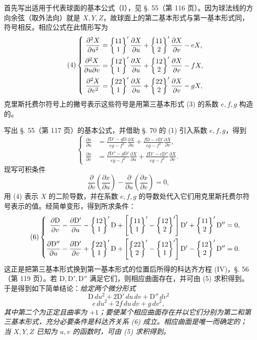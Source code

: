 首先写出适用于代表球面的基本公式（I），见 \S. 55（第 116 页）。因为球法线的方向余弦（取外法向）就是 \(X,Y,Z\)，故球面上的第二基本形式与第一基本形式同，符号相反。相应公式在此情形写为
\begin{equation}\tag{4}
\left\{
\begin{aligned}
\frac{\partial^2 X}{\partial u^2}&=\left\{\begin{matrix}11\\1\end{matrix}\right\}'\frac{\partial X}{\partial u}+\left\{\begin{matrix}11\\2\end{matrix}\right\}'\frac{\partial X}{\partial v}-eX,\\
\frac{\partial^2 X}{\partial u\partial v}&=\left\{\begin{matrix}12\\1\end{matrix}\right\}'\frac{\partial X}{\partial u}+\left\{\begin{matrix}12\\2\end{matrix}\right\}'\frac{\partial X}{\partial v}-fX,\\
\frac{\partial^2 X}{\partial v^2}&=\left\{\begin{matrix}22\\1\end{matrix}\right\}'\frac{\partial X}{\partial u}+\left\{\begin{matrix}22\\2\end{matrix}\right\}'\frac{\partial X}{\partial v}-gX,
\end{aligned}\right.
\end{equation}
克里斯托费尔符号上的撇号表示这些符号是用第三基本形式 (3) 的系数 \(e,f,g\) 构造的。

写出 \S. 55（第 117 页）的基本公式，并借助 \S. 70 的 (1) 引入系数 \(e,f,g\)，得到
\begin{equation}\tag{5}
\left\{
\begin{aligned}
\frac{\partial x}{\partial u}&=\frac{f\mathrm D'-g\mathrm D}{eg-f^2}\frac{\partial X}{\partial u}+\frac{f\mathrm D-e\mathrm D'}{eg-f^2}\frac{\partial X}{\partial v},\\
\frac{\partial x}{\partial v}&=\frac{f\mathrm D''-g\mathrm D'}{eg-f^2}\frac{\partial X}{\partial u}+\frac{f\mathrm D'-e\mathrm D''}{eg-f^2}\frac{\partial X}{\partial v}.
\end{aligned}\right.
\end{equation}
现写可积条件
\[
 \frac{\partial}{\partial v}\left(\frac{\partial x}{\partial u}\right)-\frac{\partial}{\partial u}\left(\frac{\partial x}{\partial v}\right)=0,
\]
用 (4) 表示 \(X\) 的二阶导数，并在系数 \(e,f,g\) 的导数处代入它们用克里斯托费尔符号表示的值。经简单变形，得到所求条件：
\begin{equation}\tag{6}
\left\{
\begin{aligned}
\frac{\partial\mathrm D}{\partial v}-\frac{\partial\mathrm D'}{\partial u}-\left\{\begin{matrix}12\\1\end{matrix}\right\}'\mathrm D+
\left[\left\{\begin{matrix}11\\1\end{matrix}\right\}'-\left\{\begin{matrix}12\\2\end{matrix}\right\}'\right]\mathrm D'+\left\{\begin{matrix}11\\2\end{matrix}\right\}'\mathrm D''&=0,\\
\frac{\partial\mathrm D''}{\partial u}-\frac{\partial\mathrm D'}{\partial v}+\left\{\begin{matrix}22\\1\end{matrix}\right\}'\mathrm D+
\left[\left\{\begin{matrix}22\\2\end{matrix}\right\}'-\left\{\begin{matrix}12\\1\end{matrix}\right\}'\right]\mathrm D'-\left\{\begin{matrix}12\\2\end{matrix}\right\}'\mathrm D''&=0.
\end{aligned}\right.
\end{equation}
这正是把第三基本形式换到第一基本形式的位置后所得的科达齐方程 (IV)，\S. 56（第 119 页）。若 \(\mathrm D,\mathrm D',\mathrm D''\) 满足它们，则相应曲面存在，并可由 (5) 求积得到。于是得到如下简单结论：\emph{给定两个微分形式}
\[
 \mathrm D\,du^2+2\mathrm D'\,du\,dv+\mathrm D''\,dv^2
\]
\[
 e\,du^2+2f\,du\,dv+g\,dv^2,
\]
\emph{其中第二个为正定且曲率为 \(+1\)；要使某个相应曲面存在并以它们分别为第二和第三基本形式，充分必要条件是科达齐关系 (6) 成立。相应曲面是唯一而确定的；当 \(X,Y,Z\) 已知为 \(u,v\) 的函数时，可由 (5) 求积得到。}

